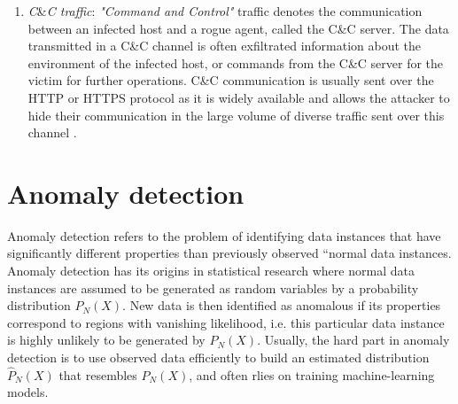 \begin{enumerate}
\item \textit{C}\&\textit{C traffic}: \textit{"Command and Control"} traffic denotes the communication between an infected host and a rogue agent, called the C\&C server. The data transmitted in a C\&C channel is often exfiltrated information about the environment of the infected host, or commands from the C\&C server for the victim for further operations. %
C\&C communication is usually sent over the HTTP or HTTPS protocol as it is widely available and allows the attacker to hide their communication in the large volume of diverse traffic sent over this channel \cite{lamprakis2017unsupervised}.

\end{enumerate}





\section{Anomaly detection}

Anomaly detection refers to the problem of identifying data instances that have significantly different properties than previously observed ``normal data instances. Anomaly detection has its origins in statistical research where normal data instances are assumed to be generated as random variables by a probability distribution $P_\textit{N}(X)$. New data is then identified as anomalous if its properties correspond to regions with vanishing likelihood, i.e. this particular data instance is highly unlikely to be generated by $P_\textit{N}(X)$. Usually, the hard part in anomaly detection is to use observed data efficiently to build an estimated distribution $\hat{P}_\textit{N}(X)$ that resembles $P_\textit{N}(X)$, and often rlies on training machine-learning models. 

